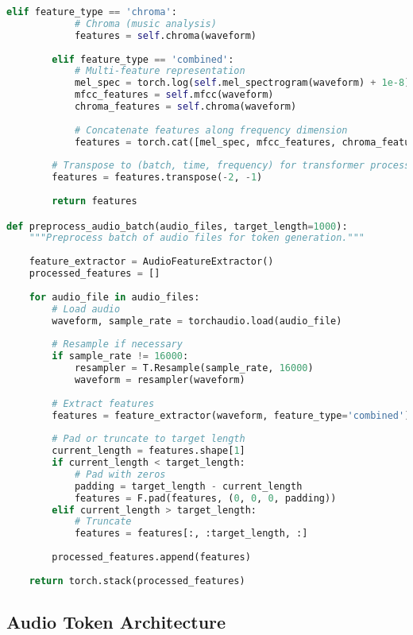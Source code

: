 \begin{lstlisting}[language=Python, caption=Audio feature extraction for token generation]
        elif feature_type == 'chroma':
            # Chroma (music analysis)
            features = self.chroma(waveform)
            
        elif feature_type == 'combined':
            # Multi-feature representation
            mel_spec = torch.log(self.mel_spectrogram(waveform) + 1e-8)
            mfcc_features = self.mfcc(waveform)
            chroma_features = self.chroma(waveform)
            
            # Concatenate features along frequency dimension
            features = torch.cat([mel_spec, mfcc_features, chroma_features], dim=1)
        
        # Transpose to (batch, time, frequency) for transformer processing
        features = features.transpose(-2, -1)
        
        return features

def preprocess_audio_batch(audio_files, target_length=1000):
    """Preprocess batch of audio files for token generation."""
    
    feature_extractor = AudioFeatureExtractor()
    processed_features = []
    
    for audio_file in audio_files:
        # Load audio
        waveform, sample_rate = torchaudio.load(audio_file)
        
        # Resample if necessary
        if sample_rate != 16000:
            resampler = T.Resample(sample_rate, 16000)
            waveform = resampler(waveform)
        
        # Extract features
        features = feature_extractor(waveform, feature_type='combined')
        
        # Pad or truncate to target length
        current_length = features.shape[1]
        if current_length < target_length:
            # Pad with zeros
            padding = target_length - current_length
            features = F.pad(features, (0, 0, 0, padding))
        elif current_length > target_length:
            # Truncate
            features = features[:, :target_length, :]
        
        processed_features.append(features)
    
    return torch.stack(processed_features)
\end{lstlisting}

\subsection{Audio Token Architecture}

